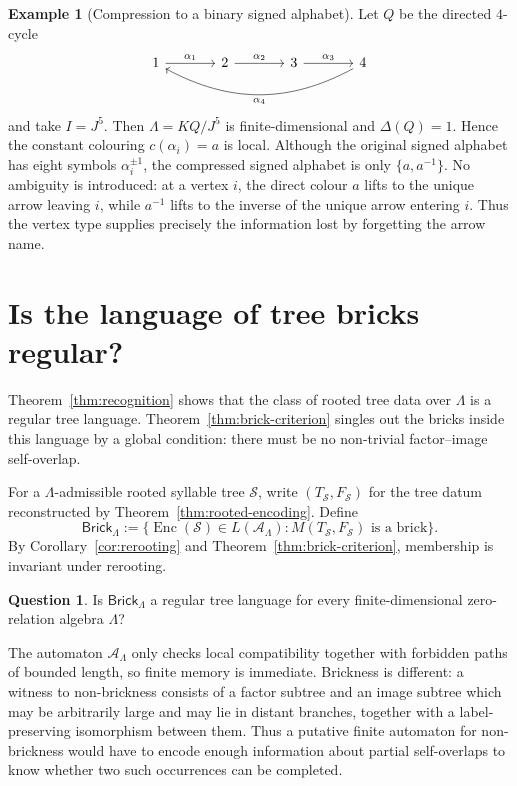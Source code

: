 \documentclass[11pt,a4paper]{amsart}
\newcommand{\Enc}{\operatorname{Enc}}
\theoremstyle{definition}
\newtheorem{question}[definition]{Question}
\newtheorem{example}[definition]{Example}
\theoremstyle{plain}
\theoremstyle{remark}
\numberwithin{equation}{section}
\begin{document}
\begin{example}[Compression to a binary signed alphabet]\label{ex:compression-cycle}
Let $Q$ be the directed $4$-cycle
\[
\begin{tikzcd}[column sep=large]
1 \arrow[r,"\alpha_1"] & 2 \arrow[r,"\alpha_2"] & 3 \arrow[r,"\alpha_3"] & 4 \arrow[lll,bend left=28,"\alpha_4"]
\end{tikzcd}
\]
and take $I=J^5$. Then $\Lambda=KQ/J^5$ is finite-dimensional and $\Delta(Q)=1$. Hence the constant colouring $c(\alpha_i)=a$ is local. Although the original signed alphabet has eight symbols $\alpha_i^{\pm1}$, the compressed signed alphabet is only $\{a,a^{-1}\}$. No ambiguity is introduced: at a vertex $i$, the direct colour $a$ lifts to the unique arrow leaving $i$, while $a^{-1}$ lifts to the inverse of the unique arrow entering $i$. Thus the vertex type supplies precisely the information lost by forgetting the arrow name.
\end{example}

\section{Is the language of tree bricks regular?}
\label{sec:regularity}

Theorem~\ref{thm:recognition} shows that the class of rooted tree data over $\Lambda$ is a regular tree language. Theorem~\ref{thm:brick-criterion} singles out the bricks inside this language by a global condition: there must be no non-trivial factor--image self-overlap.

For a $\Lambda$-admissible rooted syllable tree $\mathcal S$, write $(T_{\mathcal S},F_{\mathcal S})$ for the tree datum reconstructed by Theorem~\ref{thm:rooted-encoding}. Define
\[
\mathsf{Brick}_\Lambda:=\{\Enc(\mathcal S)\in L(\mathcal A_\Lambda):M(T_{\mathcal S},F_{\mathcal S})\text{ is a brick}\}.
\]
By Corollary~\ref{cor:rerooting} and Theorem~\ref{thm:brick-criterion}, membership is invariant under rerooting.

\begin{question}\label{que:regular-bricks}
Is $\mathsf{Brick}_\Lambda$ a regular tree language for every finite-dimensional zero-relation algebra $\Lambda$?
\end{question}

The automaton $\mathcal A_\Lambda$ only checks local compatibility together with forbidden paths of bounded length, so finite memory is immediate. Brickness is different: a witness to non-brickness consists of a factor subtree and an image subtree which may be arbitrarily large and may lie in distant branches, together with a label-preserving isomorphism between them. Thus a putative finite automaton for non-brickness would have to encode enough information about partial self-overlaps to know whether two such occurrences can be completed.
\end{document}
